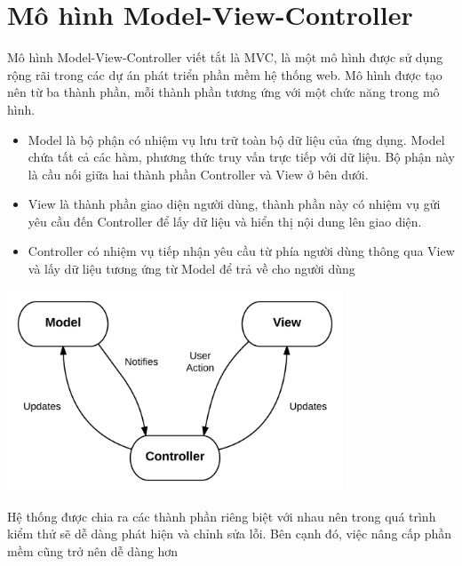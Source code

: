 \section{Mô hình Model-View-Controller}
Mô hình Model-View-Controller viết tắt là MVC, là một mô hình được sử dụng rộng rãi trong các dự án phát triển phần mềm hệ thống web. Mô hình được tạo nên từ ba thành phần, mỗi thành phần tương ứng với một chức năng trong mô hình.
\begin{itemize}
    \item Model là bộ phận có nhiệm vụ lưu trữ toàn bộ dữ liệu của ứng dụng. Model chứa tất cả các hàm, phương thức truy vấn trực tiếp với dữ liệu. Bộ phận này là cầu nối giữa hai thành phần Controller và View ở bên dưới. 
    \item View là thành phần giao diện người dùng, thành phần này có nhiệm vụ gửi yêu cầu đến Controller để lấy dữ liệu và hiển thị nội dung lên giao diện.
    \item Controller có nhiệm vụ tiếp nhận yêu cầu từ phía người dùng thông qua View và lấy dữ liệu tương ứng từ Model để trả về cho người dùng
\end{itemize}
\begin{center}
  \captionsetup{type=figure}
  \includegraphics[width=10cm]{img/MVC.png}
\end{center}

Hệ thống được chia ra các thành phần riêng biệt với nhau nên trong quá trình kiểm thử sẽ dễ dàng phát hiện và chỉnh sửa lỗi. Bên cạnh đó, việc nâng cấp phần mềm cũng trở nên dễ dàng hơn
